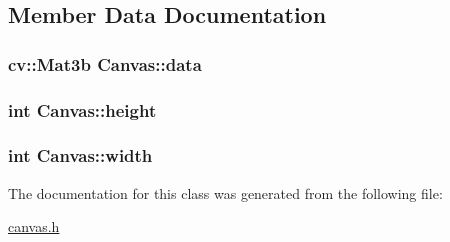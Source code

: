 \subsection{Member Data Documentation}
\subsubsection[{\texorpdfstring{data}{data}}]{\setlength{\rightskip}{0pt plus 5cm}cv\+::\+Mat3b Canvas\+::data\hspace{0.3cm}{\ttfamily [private]}}\hypertarget{classCanvas_ac5e24c180dd682c1fe9f57f4f11d5db6}{}\label{classCanvas_ac5e24c180dd682c1fe9f57f4f11d5db6}
\subsubsection[{\texorpdfstring{height}{height}}]{\setlength{\rightskip}{0pt plus 5cm}int Canvas\+::height\hspace{0.3cm}{\ttfamily [private]}}\hypertarget{classCanvas_aada7c1a775b50c422801d477e82a53ec}{}\label{classCanvas_aada7c1a775b50c422801d477e82a53ec}
\subsubsection[{\texorpdfstring{width}{width}}]{\setlength{\rightskip}{0pt plus 5cm}int Canvas\+::width\hspace{0.3cm}{\ttfamily [private]}}\hypertarget{classCanvas_a31434dcd520abfa1c1f3fb778514d173}{}\label{classCanvas_a31434dcd520abfa1c1f3fb778514d173}


The documentation for this class was generated from the following file\+:\begin{DoxyCompactItemize}
\item 
\hyperlink{canvas_8h}{canvas.\+h}\end{DoxyCompactItemize}
